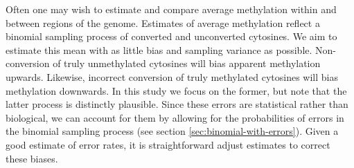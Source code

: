 \documentclass[10pt,letterpaper]{article}
\begin{document}
Often one may wish to estimate and compare average methylation within and between regions of the genome.
Estimates of average methylation reflect a binomial sampling process of converted and unconverted cytosines.
We aim to estimate this mean with as little bias and sampling variance as possible.
Non-conversion of truly unmethylated cytosines will bias apparent methylation upwards.
Likewise, incorrect conversion of truly methylated cytosines will bias methylation downwards.
In this study we focus on the former, but note that the latter process is distinctly plausible.
Since these errors are statistical rather than biological, we can account for them by allowing for the probabilities of errors in the binomial sampling process (see section \ref{sec:binomial-with-errors}).
Given a good estimate of error rates, it is straightforward adjust estimates to correct these biases.
\end{document}
